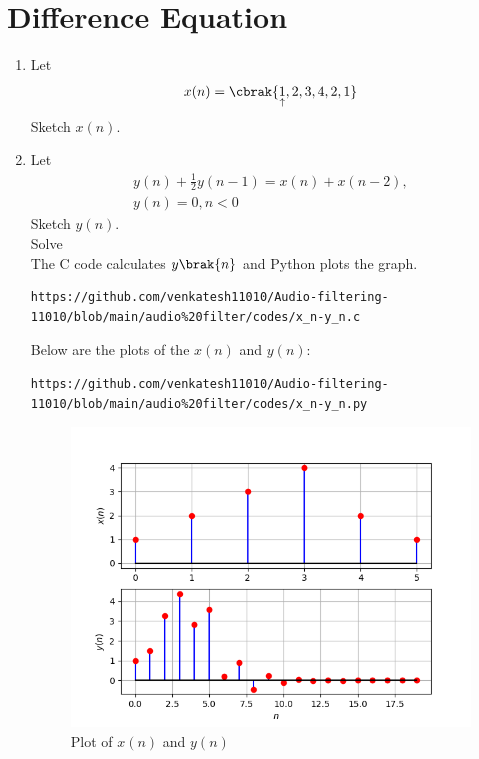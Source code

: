 \documentclass[journal,12pt,twocolumn]{IEEEtran}
\theoremstyle{remark}
\begin{document}
 \section{Difference Equation}
 \begin{enumerate}[label=\thesection.\arabic*,ref=\thesection.\theenumi]
\item Let
\begin{equation}
x(n) = \cbrak{\underset{\uparrow}{1},2,3,4,2,1} \label{q:2.1}
\end{equation}
Sketch $x(n)$. 
\item Let
\begin{multline}
y(n) + \frac{1}{2}y(n-1) = x(n) + x(n-2),
\\
y(n) = 0, n < 0 \label{q:2.2}
\end{multline}
Sketch $y(n)$.\\
Solve\\
\solution  The C code calculates $y\brak{n}$ and Python plots the graph.
\begin{lstlisting}
https://github.com/venkatesh11010/Audio-filtering-11010/blob/main/audio%20filter/codes/x_n-y_n.c
\end{lstlisting} 
Below are the plots of the $x(n)$ and $y(n)$:
\begin{lstlisting}
https://github.com/venkatesh11010/Audio-filtering-11010/blob/main/audio%20filter/codes/x_n-y_n.py
\end{lstlisting}

\begin{figure}[!ht]
	\centering
	\includegraphics[width=\columnwidth]{figs/Plot-x_ny_n.png}
	\caption{Plot of $x(n)$ and $y(n)$}
	\label{fig:xnyn}
\end{figure}
\end{enumerate}
\end{document}
